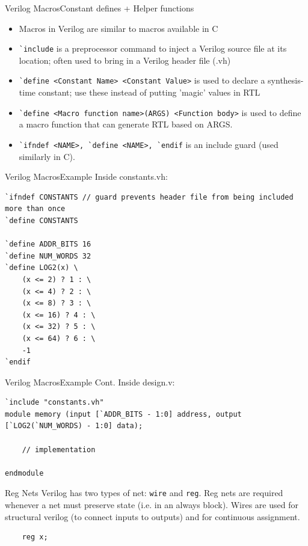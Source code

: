 \documentclass{beamer}
\begin{document}
\begin{frame}{Verilog Macros}{Constant defines + Helper functions}
	\begin{itemize}
		\item Macros in Verilog are similar to macros available in C
		\item \texttt{\`{}include} is a preprocessor command to inject a Verilog source file at its location; often used to bring in a Verilog header file (.vh)
		\item \texttt{\`{}define <Constant Name> <Constant Value>} is used to declare a synthesis-time constant; use these instead of putting 'magic' values in RTL
		\item \texttt{\`{}define <Macro function name>(ARGS) <Function body>} is used to define a macro function that can generate RTL based on ARGS.
		\item \texttt{\`{}ifndef <NAME>, \`{}define <NAME>, \`{}endif} is an include guard (used similarly in C).
	\end{itemize}
\end{frame}

\begin{frame}[fragile]{Verilog Macros}{Example}
Inside constants.vh:
\begin{verbatim}
`ifndef CONSTANTS // guard prevents header file from being included more than once
`define CONSTANTS

`define ADDR_BITS 16
`define NUM_WORDS 32
`define LOG2(x) \
	(x <= 2) ? 1 : \
	(x <= 4) ? 2 : \
	(x <= 8) ? 3 : \
	(x <= 16) ? 4 : \
	(x <= 32) ? 5 : \
	(x <= 64) ? 6 : \
	-1
`endif
\end{verbatim}
\end{frame}

\begin{frame}[fragile]{Verilog Macros}{Example Cont.}
Inside design.v:
\begin{verbatim}
`include "constants.vh"
module memory (input [`ADDR_BITS - 1:0] address, output [`LOG2(`NUM_WORDS) - 1:0] data);

	// implementation
	
endmodule
\end{verbatim}
\end{frame}

\begin{frame}[fragile]{Reg Nets}
	Verilog has two types of net: \texttt{wire} and \texttt{reg}.
	Reg nets are required whenever a net must preserve state (i.e. in an always block).
	Wires are used for structural verilog (to connect inputs to outputs) and for continuous assignment.

\begin{verbatim}
	reg x;
\end{verbatim}

\end{frame}
\end{document}
